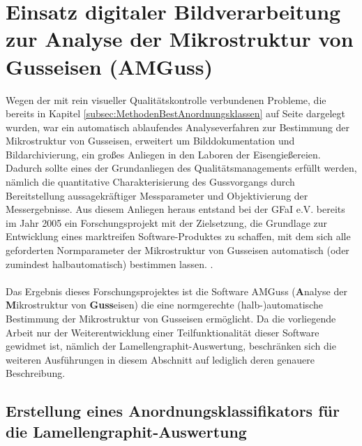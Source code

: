 \documentclass[
fontsize=10pt, 
listof = totoc,
parskip = half	
]{report}
\begin{document}
\section{Einsatz digitaler Bildverarbeitung zur Analyse der Mikrostruktur von Gusseisen (AMGuss)}
\label{sec:BestimmungMikrostrukturAMGuss}
Wegen der mit rein visueller Qualitätskontrolle verbundenen Probleme, die bereits in Kapitel \ref{subsec:MethodenBestAnordnungsklassen} auf Seite \pageref{subsec:MethodenBestAnordnungsklassen} dargelegt wurden, war ein automatisch ablaufendes Analyseverfahren zur Bestimmung der Mikrostruktur von Gusseisen, erweitert um Bilddokumentation und Bildarchivierung, ein großes Anliegen in den Laboren der Eisengießereien. Dadurch sollte eines der Grundanliegen des Qualitätsmanagements erfüllt werden, nämlich die quantitative Charakterisierung des Gussvorgangs durch Bereitstellung aussagekräftiger Messparameter und Objektivierung der Messergebnisse. Aus diesem Anliegen heraus entstand bei der GFaI e.V. bereits im Jahr 2005 ein Forschungsprojekt mit der Zielsetzung, die Grundlage zur Entwicklung eines marktreifen Software-Produktes zu schaffen, mit dem sich alle geforderten Normparameter der Mikrostruktur von Gusseisen automatisch (oder zumindest halbautomatisch) bestimmen lassen. \cite[Seite 3]{AMGuss2007}.
\\\\
Das Ergebnis dieses Forschungsprojektes ist die Software AMGuss (\textbf{A}nalyse der \textbf{M}ikrostruktur von \textbf{Guss}eisen) die eine normgerechte (halb-)automatische Bestimmung der Mikrostruktur von Gusseisen ermöglicht. Da die vorliegende Arbeit nur der Weiterentwicklung einer Teilfunktionalität dieser Software gewidmet ist, nämlich der Lamellengraphit-Auswertung, beschränken sich die weiteren Ausführungen in diesem Abschnitt auf lediglich deren genauere Beschreibung. 

\subsection{Erstellung eines Anordnungsklassifikators für die Lamellengraphit-Auswertung}
\label{subsec: ErstellungAnordnungsklassifAMGuss}
\end{document}
